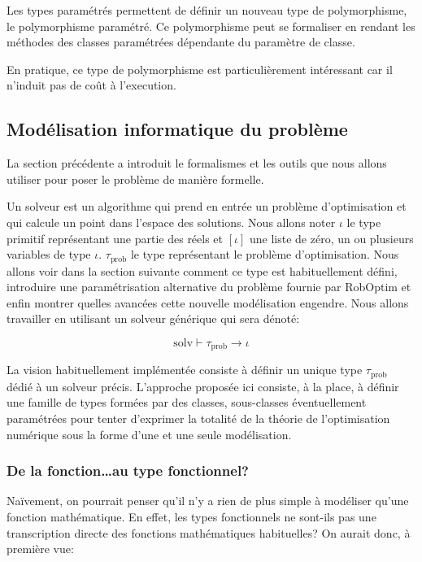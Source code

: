 Les types paramétrés permettent de définir un nouveau type de
polymorphisme, le polymorphisme
paramétré. Ce
polymorphisme peut se formaliser en rendant les méthodes des classes
paramétrées dépendante du paramètre de classe.

En pratique, ce type de polymorphisme est particulièrement intéressant
car il n'induit pas de coût à l'execution.


\subsection{Modélisation informatique du problème}

La section précédente a introduit le formalismes et les outils que
nous allons utiliser pour poser le problème de manière formelle.


Un solveur est un algorithme qui prend en entrée un problème
d'optimisation et qui calcule un point dans l'espace des solutions.
Nous allons noter $\iota$ le type primitif représentant une partie des
réels et $[\iota]$ une liste de zéro, un ou plusieurs variables de
type $\iota$. $\tau_{\text{prob}}$ le type représentant le problème
d'optimisation. Nous allons voir dans la section suivante comment ce
type est habituellement défini, introduire une paramétrisation
alternative du problème fournie par RobOptim et enfin montrer quelles
avancées cette nouvelle modélisation engendre.  Nous allons travailler
en utilisant un solveur générique qui sera dénoté:


\begin{equation}\label{eq:chap1_prob_type}
  \text{solv} \vdash \tau_{\text{prob}} \rightarrow \iota
\end{equation}


La vision habituellement implémentée consiste à définir un unique type
$\tau_{\text{prob}}$ dédié à un solveur précis. L'approche proposée
ici consiste, à la place, à définir une famille de types formées par
des classes, sous-classes éventuellement paramétrées pour tenter
d'exprimer la totalité de la théorie de l'optimisation numérique sous
la forme d'une et une seule modélisation.


\subsubsection{De la fonction\ldots au type fonctionnel?}


Naïvement, on pourrait penser qu'il n'y a rien de plus simple à
modéliser qu'une fonction mathématique. En effet, les types
fonctionnels ne sont-ils pas une transcription directe des fonctions
mathématiques habituelles? On aurait donc, à première vue:

